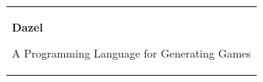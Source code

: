 %
\begin{titlepage}
\vspace*{\fill}
  \addtolength{\hoffset}{0.5\evensidemargin-0.5\oddsidemargin} %
  \noindent%
  {\color{white}\colorbox{aaublue}{\begin{tabular}{@{}p{\textwidth}@{}}
    \begin{center}
    \Huge{\textbf{
      Dazel%
    }}
    \end{center}
    \begin{center}
      \Large{
        A Programming Language for Generating Games%
}
\end{center}
\end{tabular}}}
\end{titlepage}
